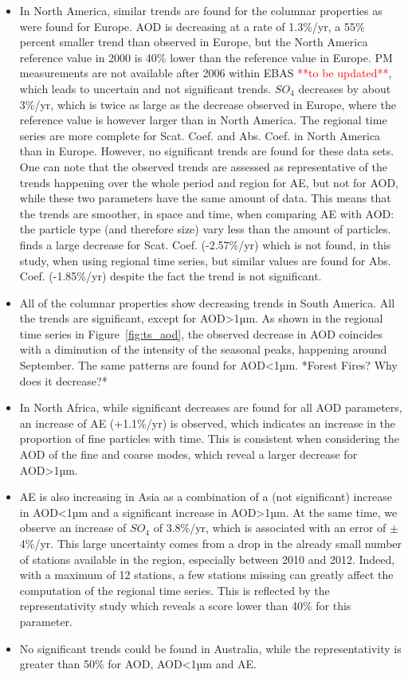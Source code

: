 \documentclass[journal abbreviation, manuscript]{copernicus}
\begin{document}
\begin{itemize}
 \item In North America, similar trends are found for the columnar properties as were found for Europe. AOD is decreasing at a rate of 1.3\%/yr, a 55\% percent smaller trend than observed in Europe, but the North America reference value in 2000 is 40\% lower than the reference value in Europe. PM measurements are not available after 2006 within EBAS \textcolor{red}{**to be updated**}, which leads to uncertain and not significant trends. $SO_{4}$ decreases by about 3\%/yr, which is twice as large as the decrease observed in Europe, where the reference value is however larger than in North America. The regional time series are more complete for Scat. Coef. and Abs. Coef. in North America than in Europe. However, no significant trends are found for these data sets. One can note that the observed trends are assessed as representative of the trends happening over the whole period and region for AE, but not for AOD, while these two parameters have the same amount of data. This means that the trends are smoother, in space and time, when comparing AE with AOD: the particle type (and therefore size) vary less than the amount of particles. \cite{collaudcoenprep} finds a large decrease for Scat. Coef. (-2.57\%/yr) which is not found, in this study,  when using regional time series, but similar values are found for Abs. Coef. (-1.85\%/yr) despite the fact the trend is not significant.
 \item All of the columnar properties show decreasing trends in South America. All the trends are significant, except for AOD>1µm. As shown in the regional time series in Figure~\ref{fig:ts_aod}, the observed decrease in AOD coincides with a diminution of the intensity of the seasonal peaks, happening around September. The same patterns are found for AOD<1µm. *Forest Fires? Why does it decrease?*
 \item In North Africa, while significant decreases are found for all AOD parameters, an increase of AE (+1.1\%/yr) is observed, which indicates an increase in the proportion of fine particles with time. This is consistent when considering the AOD of the fine and coarse modes, which reveal a larger decrease for AOD>1µm.
 \item AE is also increasing in Asia as a combination of a (not significant) increase in AOD<1µm and a significant increase in AOD>1µm. At the same time, we observe an increase of $SO_{4}$ of 3.8\%/yr, which is associated with an error of ${\pm}$ 4\%/yr. This large uncertainty comes from a drop in the already small number of stations available in the region, especially between 2010 and 2012. Indeed, with a maximum of 12 stations, a few stations missing can greatly affect the computation of the regional time series. This is reflected by the representativity study which reveals a score lower than 40\% for this parameter.
 \item No significant trends could be found in Australia, while the representativity is greater than 50\% for AOD, AOD<1µm and AE.

\end{itemize}
\end{document}
